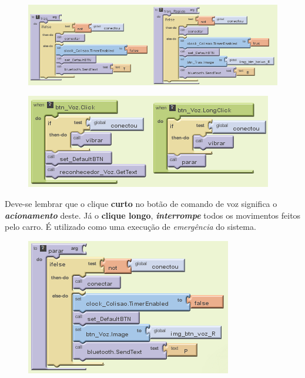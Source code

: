 \documentclass[portugues, brazil, a4paper,12pt]{article}
\begin{document}
\begin{figure}[H]
	\centering
	\includegraphics[scale=.8]{img/controle/tras.png}
	
\end{figure}



\begin{figure}[H]
	\centering
	\includegraphics[scale=.8]{img/controle/fvoz.png}
	
\end{figure}

Deve-se lembrar que o clique \textbf{curto} no botão de comando de voz significa o \textit{\textbf{acionamento}} deste. Já o \textbf{clique longo}, \textit{\textbf{interrompe}} todos os movimentos feitos pelo carro. É utilizado como uma execução de \textit{emergência} do sistema.


\begin{figure}[H]
	\centering
	\includegraphics[scale=.8]{img/controle/parar.png}
	
\end{figure}
\end{document}
